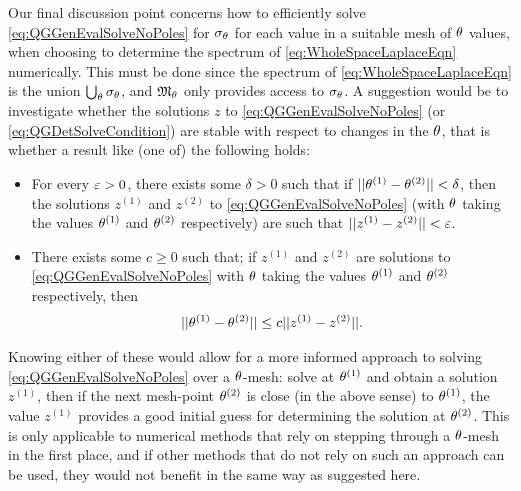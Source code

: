Our final discussion point concerns how to efficiently solve \eqref{eq:QGGenEvalSolveNoPoles} for $\sigma_\theta$ for each value in a suitable mesh of $\theta$ values, when choosing to determine the spectrum of \eqref{eq:WholeSpaceLaplaceEqn} numerically.
This must be done since the spectrum of \eqref{eq:WholeSpaceLaplaceEqn} is the union $\bigcup_{\theta}\sigma_\theta$, and $\mathfrak{M}_\theta$ only provides access to $\sigma_\theta$.
A suggestion would be to investigate whether the solutions $z$ to \eqref{eq:QGGenEvalSolveNoPoles} (or \eqref{eq:QGDetSolveCondition}) are stable with respect to changes in the $\theta$, that is whether a result like (one of) the following holds:
\begin{itemize}
	\item For every $\varepsilon>0$, there exists some $\delta>0$ such that if $\lvert\lvert \theta^{(1)}-\theta^{(2)} \rvert\rvert<\delta$, then the solutions $z^{(1)}$ and $z^{(2)}$ to \eqref{eq:QGGenEvalSolveNoPoles} (with $\theta$ taking the values $\theta^{(1)}$ and $\theta^{(2)}$ respectively) are such that $\lvert\lvert z^{(1)}-z^{(2)} \rvert\rvert<\varepsilon$.
	\item There exists some $c\geq 0$ such that; if $z^{(1)}$ and $z^{(2)}$ are solutions to \eqref{eq:QGGenEvalSolveNoPoles} with $\theta$ taking the values $\theta^{(1)}$ and $\theta^{(2)}$ respectively, then
	\begin{align*}
		\lvert\lvert \theta^{(1)}-\theta^{(2)} \rvert\rvert \leq c \lvert\lvert z^{(1)}-z^{(2)} \rvert\rvert.
	\end{align*}
\end{itemize}
Knowing either of these would allow for a more informed approach to solving \eqref{eq:QGGenEvalSolveNoPoles} over a $\theta$-mesh: solve at $\theta^{(1)}$ and obtain a solution $z^{(1)}$, then if the next mesh-point $\theta^{(2)}$ is close (in the above sense) to $\theta^{(1)}$, the value $z^{(1)}$ provides a good initial guess for determining the solution at $\theta^{(2)}$.
This is only applicable to numerical methods that rely on stepping through a $\theta$-mesh in the first place, and if other methods that do not rely on such an approach can be used, they would not benefit in the same way as suggested here.
